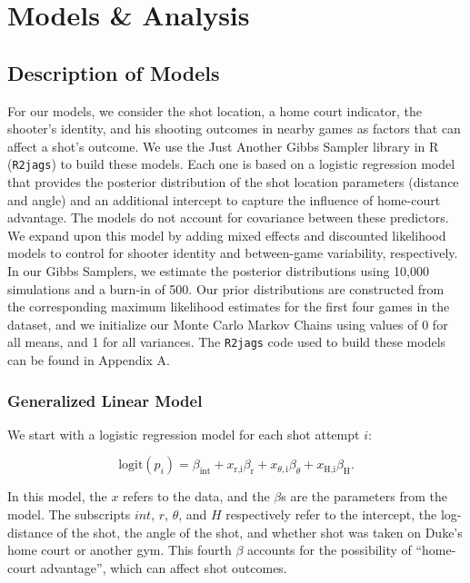 \documentclass[12pt,twoside]{dukestatscithesis}
\theoremstyle{definition}
\theoremstyle{definition}
\theoremstyle{definition}
\theoremstyle{remark}
\begin{document}
\chapter{Models \& Analysis}\label{models}

\section{Description of Models}\label{description-of-models}

For our models, we consider the shot location, a home court indicator,
the shooter's identity, and his shooting outcomes in nearby games as
factors that can affect a shot's outcome. We use the Just Another Gibbs
Sampler library in R (\texttt{R2jags}) to build these models. Each one
is based on a logistic regression model that provides the posterior
distribution of the shot location parameters (distance and angle) and an
additional intercept to capture the influence of home-court advantage.
The models do not account for covariance between these predictors. We
expand upon this model by adding mixed effects and discounted likelihood
models to control for shooter identity and between-game variability,
respectively. In our Gibbs Samplers, we estimate the posterior
distributions using 10,000 simulations and a burn-in of 500. Our prior
distributions are constructed from the corresponding maximum likelihood
estimates for the first four games in the dataset, and we initialize our
Monte Carlo Markov Chains using values of 0 for all means, and 1 for all
variances. The \texttt{R2jags} code used to build these models can be
found in Appendix A.

\subsection{Generalized Linear Model}\label{generalized-linear-model}

We start with a logistic regression model for each shot attempt \(i\):

\[
\text{logit}(p_{i}) = 
\beta_{\text{int}} +
x_{\text{r,i}}\beta_{\text{r}} +
x_{\theta,\text{i}}\beta_{\theta} +
x_{\text{H,i}}\beta_{\text{H}}.
\]

In this model, the \(x\) refers to the data, and the \(\beta\)s are the
parameters from the model. The subscripts \(\textit{int}\),
\(\textit{r}\), \(\theta\), and \(\textit{H}\) respectively refer to the
intercept, the log-distance of the shot, the angle of the shot, and
whether shot was taken on Duke's home court or another gym. This fourth
\(\beta\) accounts for the possibility of ``home-court advantage'',
which can affect shot outcomes.
\end{document}
